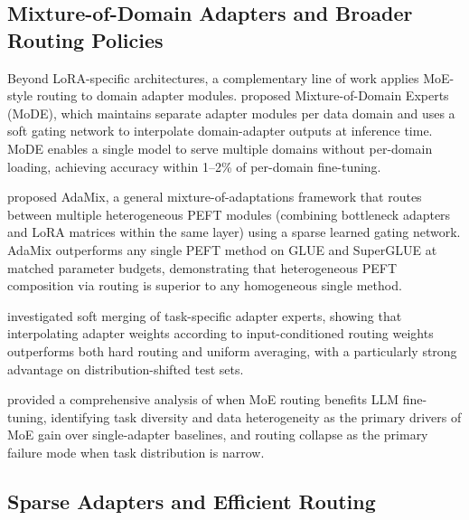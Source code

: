 \subsection{Mixture-of-Domain Adapters and Broader Routing Policies}
\label{sec:moe_routing:domain}

Beyond LoRA-specific architectures, a complementary line of work applies MoE-style
routing to domain adapter modules. \citet{DiaomMoDE2023} proposed Mixture-of-Domain
Experts (MoDE), which maintains separate adapter modules per data domain and uses a
soft gating network to interpolate domain-adapter outputs at inference time. MoDE
enables a single model to serve multiple domains without per-domain loading, achieving
accuracy within 1--2\% of per-domain fine-tuning.

\citet{WangAdaMix2022} proposed AdaMix, a general mixture-of-adaptations framework
that routes between multiple heterogeneous PEFT modules (combining bottleneck adapters
and LoRA matrices within the same layer) using a sparse learned gating network. AdaMix
outperforms any single PEFT method on GLUE and SuperGLUE at matched parameter budgets,
demonstrating that heterogeneous PEFT composition via routing is superior to any
homogeneous single method.

\citet{Muqeeth2024} investigated soft merging of task-specific adapter experts, showing
that interpolating adapter weights according to input-conditioned routing weights
outperforms both hard routing and uniform averaging, with a particularly strong
advantage on distribution-shifted test sets.

\citet{LiuWhenMOE2024} provided a comprehensive analysis of when MoE routing benefits
LLM fine-tuning, identifying task diversity and data heterogeneity as the primary
drivers of MoE gain over single-adapter baselines, and routing collapse as the primary
failure mode when task distribution is narrow.

\subsection{Sparse Adapters and Efficient Routing}
\label{sec:moe_routing:sparse}


